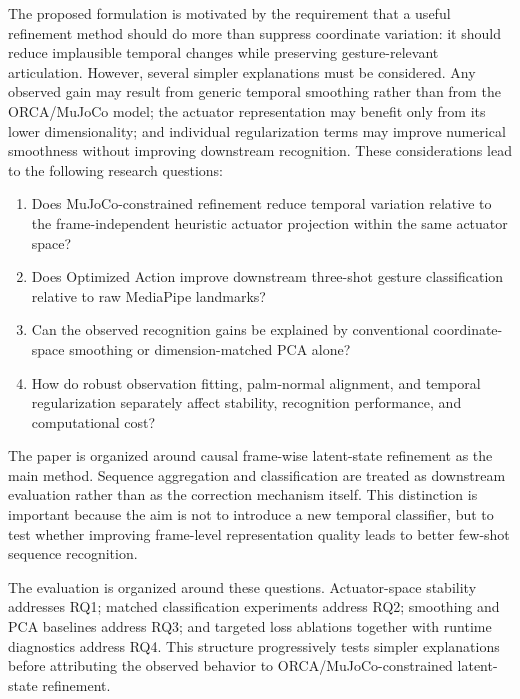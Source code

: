 \documentclass[11pt]{article}
\begin{document}
The proposed formulation is motivated by the requirement that a useful refinement method should do more than suppress coordinate variation: it should reduce implausible temporal changes while preserving gesture-relevant articulation. However, several simpler explanations must be considered. Any observed gain may result from generic temporal smoothing rather than from the ORCA/MuJoCo model; the actuator representation may benefit only from its lower dimensionality; and individual regularization terms may improve numerical smoothness without improving downstream recognition. These considerations lead to the following research questions:
\begin{enumerate}[leftmargin=*]
    \item[\textbf{RQ1}] Does MuJoCo-constrained refinement reduce temporal variation relative to the frame-independent heuristic actuator projection within the same actuator space?
    \item[\textbf{RQ2}] Does Optimized Action improve downstream three-shot gesture classification relative to raw MediaPipe landmarks?
    \item[\textbf{RQ3}] Can the observed recognition gains be explained by conventional coordinate-space smoothing or dimension-matched PCA alone?
    \item[\textbf{RQ4}] How do robust observation fitting, palm-normal alignment, and temporal regularization separately affect stability, recognition performance, and computational cost?
\end{enumerate}

The paper is organized around causal frame-wise latent-state refinement as the main method. Sequence aggregation and classification are treated as downstream evaluation rather than as the correction mechanism itself. This distinction is important because the aim is not to introduce a new temporal classifier, but to test whether improving frame-level representation quality leads to better few-shot sequence recognition.

The evaluation is organized around these questions. Actuator-space stability addresses RQ1; matched classification experiments address RQ2; smoothing and PCA baselines address RQ3; and targeted loss ablations together with runtime diagnostics address RQ4. This structure progressively tests simpler explanations before attributing the observed behavior to ORCA/MuJoCo-constrained latent-state refinement.
\end{document}
